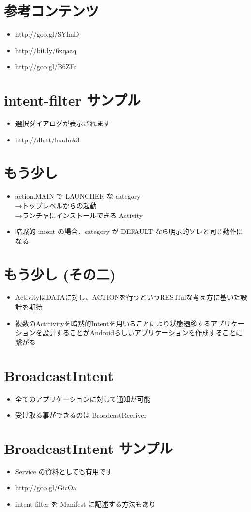 \documentclass[slide,papersize]{jsarticle}
\begin{document}
\section*{参考コンテンツ}
\bigskip
\begin{itemize}
\item http://goo.gl/SYlmD
\bigskip
\item http://bit.ly/6xqaaq
\bigskip
\item http://goo.gl/B6ZFa
\end{itemize}

\section*{intent-filter サンプル}
\bigskip
\begin{itemize}
\item 選択ダイアログが表示されます
\bigskip
\item http://db.tt/hxolnA3
\end{itemize}

\section*{もう少し}
\bigskip
\begin{itemize}
\item action.MAIN で LAUNCHER な category\\→トップレベルからの起動\\→ランチャにインストールできる Activity
\bigskip
\item 暗黙的 intent の場合、category が DEFAULT なら明示的ソレと同じ動作になる
\end{itemize}

\section*{もう少し (その二)}
\bigskip
\begin{itemize}
\item ActivityはDATAに対し、ACTIONを行うというRESTfulな考え方に基いた設計を期待
\bigskip
\item 複数のActitivityを暗黙的Intentを用いることにより状態遷移するアプリケーションを設計することがAndroidらしいアプリケーションを作成することに繋がる
\end{itemize}

\section*{BroadcastIntent}
\bigskip
\begin{itemize}
\item 全てのアプリケーションに対して通知が可能
\bigskip
\item 受け取る事ができるのは BroadcastReceiver
\end{itemize}

\section*{BroadcastIntent サンプル}
\bigskip
\begin{itemize}
\item Service の資料としても有用です
\bigskip
\item http://goo.gl/GicOa
\bigskip
\item intent-filter を Manifest に記述する方法もあり
\end{itemize}
\end{document}
